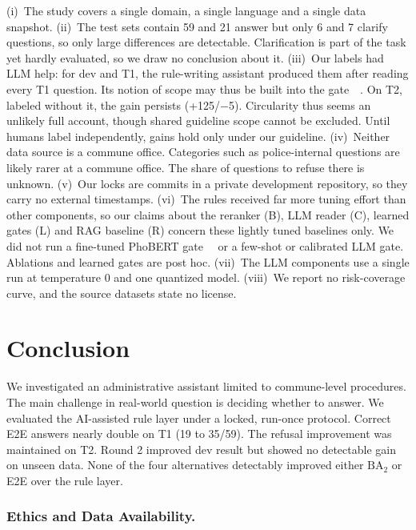 \documentclass[runningheads]{llncs}
\newcommand{\BA}{\ensuremath{\mathrm{BA}_2}}
\begin{document}
(i)~{The study covers a single domain, a single language and a single data snapshot.} 
(ii)~{The test sets contain 59 and 21 answer but only 6 and 7 clarify questions, so only large differences are detectable. Clarification is part of the task yet hardly evaluated, so we draw no conclusion about it.} 
(iii)~{Our labels had LLM help: for dev and T1, the rule-writing assistant produced them after reading every T1 question. Its notion of scope may thus be built into the gate~~\cite{pangakis2023,reiss2023}. On T2, labeled without it, the gain persists (+125/$-$5). Circularity thus seems an unlikely full account, though shared guideline scope cannot be excluded. Until humans label independently, gains hold only under our guideline.} 
(iv)~{Neither data source is a commune office. Categories such as police-internal questions are likely rarer at a commune office. The share of questions to refuse there is unknown.} 
(v)~{Our locks are commits in a private development repository, so they carry no external timestamps.
} 
(vi)~{The rules received far more tuning effort than other components, so our claims about the reranker (B), LLM reader (C), learned gates (L) and RAG baseline (R) concern these lightly tuned baselines only. We did not run a fine-tuned PhoBERT gate~~\cite{nguyen2020phobert} or a few-shot or calibrated LLM gate. Ablations and learned gates are post hoc.} 
(vii)~{The LLM components use a single run at
temperature 0 and one quantized model.} 
(viii)~{We report no risk-coverage curve, and the source datasets state no license.}

\section{Conclusion}\label{sec:conclusion}

{We investigated an administrative assistant limited to commune-level procedures. The main challenge in real-world question is deciding whether to answer. We evaluated the AI-assisted rule layer under a locked, run-once protocol. Correct E2E answers nearly double on T1 (19 to 35/59). The refusal improvement was maintained on T2. Round 2 improved dev result but showed no detectable gain on unseen data. None of the four alternatives detectably improved either \BA{} or E2E over the rule layer.}

\subsubsection{Ethics and Data Availability.}
\end{document}
